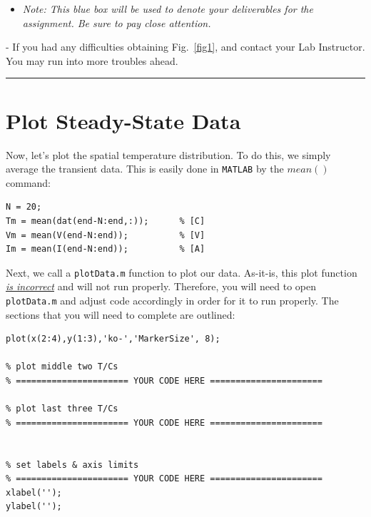 \documentclass[11pt, letterpaper]{article}
\begin{document}
\begin{itemize}
    \item \textit{Note: This blue box will be used to denote your deliverables for the assignment. Be sure to pay close attention.}
\end{itemize}


\begin{center}
\begin{tcolorbox}[enhanced, width=14cm, size=tight, top=-2mm, colback=red!5, colframe=black!50!white, boxrule=0.25pt, boxsep=2mm]
\n
{\small
{} - If you had any difficulties obtaining Fig.~\ref{fig1},  and contact your Lab Instructor. You may run into more troubles ahead.
}
\end{tcolorbox}
\end{center}
\hrule

\section{Plot Steady-State Data}

Now, let's plot the spatial temperature distribution. To do this, we simply average the transient data. This is easily done in \texttt{MATLAB} by the $mean( )$ command:

\begin{lstlisting}[numbers=none]
% take an average of the last (~20) points 
N = 20;
Tm = mean(dat(end-N:end,:));      % [C]
Vm = mean(V(end-N:end));          % [V]
Im = mean(I(end-N:end));          % [A]
\end{lstlisting}

Next, we call a \texttt{plotData.m} function to plot our data. As-it-is, this plot function \textit{\ul{is incorrect}} and will not run properly. Therefore, you will need to open \texttt{plotData.m} and adjust code accordingly in order for it to run properly. The sections that you will need to complete are outlined:

\n
\begin{lstlisting}[numbers=none]
% plot first three T/Cs
plot(x(2:4),y(1:3),'ko-','MarkerSize', 8);

% plot middle two T/Cs
% ====================== YOUR CODE HERE ======================

% plot last three T/Cs
% ====================== YOUR CODE HERE ======================


% set labels & axis limits
% ====================== YOUR CODE HERE ======================
xlabel('');
ylabel('');
\end{lstlisting}
\end{document}
